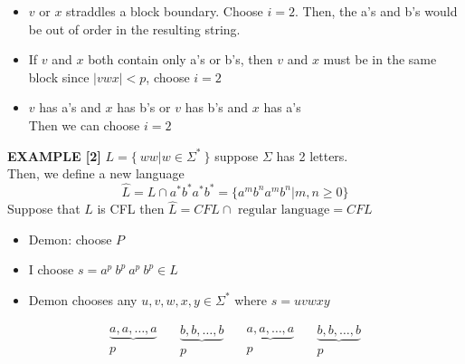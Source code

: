 \documentclass[11pt]{article}
\begin{document}
\begin{itemize}
	\item $v$  or $x$ straddles a block boundary. Choose $i=2$. Then, the a's and b's would be out of order in the resulting string.
	\item If $v$ and $x$ both contain only a's or b's, then $v$ and $x$ must be in the same block since $|vwx|<p$, choose $i = 2$
	\item $v$ has a's and $x$ has b's or $v$ has b's and $x$ has a's\\
		Then we can choose $i = 2$
	
\end{itemize}

\newpage

\textbf{EXAMPLE [2]} $L = \{\ ww | w \in \Sigma^*\ \}$ suppose $\Sigma$ has 2 letters.\\
Then, we define a new language 
$$\widehat{L} = L \cap a^*b^*a^*b^* = \{ a^m b^n a^m b^n | m, n \geq 0 \}$$
Suppose that $L$ is CFL then $\widehat{L} = CFL \cap \text{ regular language} = CFL$
\begin{itemize}
	\item Demon: choose $P$
	\item I choose $s = a^p\ b^p\ a^p\ b^p  \in L$
	\item Demon chooses any $ u,v,w,x,y \in \Sigma^*$ where $s=uvwxy$
\end{itemize}
$$ \begin{matrix} \underbrace{ a, a, \ldots, a } \\ p \end{matrix} \quad \begin{matrix} \underbrace{ b, b, \ldots, b } \\ p \end{matrix} \quad
\begin{matrix} \underbrace{ a, a, \ldots, a } \\ p \end{matrix} \quad
\begin{matrix} \underbrace{ b, b, \ldots, b } \\ p \end{matrix} $$
\end{document}
